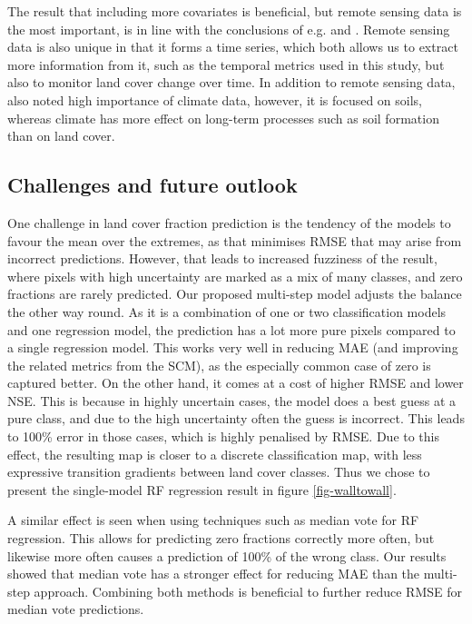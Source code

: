 \documentclass[review,authoryear,3p]{elsarticle}
\begin{document}
The result that including more covariates is beneficial, but remote sensing data is the most important, is in line with the conclusions of e.g. \citet{li_monitoring_2018} and \citet{hengl_soilgrids250m_2017}.
Remote sensing data is also unique in that it forms a time series, which both allows us to extract more information from it, such as the temporal metrics used in this study, but also to monitor land cover change over time.
In addition to remote sensing data, \citet{hengl_soilgrids250m_2017} also noted high importance of climate data, however, it is focused on soils, whereas climate has more effect on long-term processes such as soil formation than on land cover.

\subsection{Challenges and future outlook}

One challenge in land cover fraction prediction is the tendency of the models to favour the mean over the extremes, as that minimises \gls{RMSE} that may arise from incorrect predictions.
However, that leads to increased fuzziness of the result, where pixels with high uncertainty are marked as a mix of many classes, and zero fractions are rarely predicted.
Our proposed multi-step model adjusts the balance the other way round.
As it is a combination of one or two classification models and one regression model, the prediction has a lot more pure pixels compared to a single regression model.
This works very well in reducing \gls{MAE} (and improving the related metrics from the \gls{SCM}), as the especially common case of zero is captured better.
On the other hand, it comes at a cost of higher \gls{RMSE} and lower \gls{NSE}.
This is because in highly uncertain cases, the model does a best guess at a pure class, and due to the high uncertainty often the guess is incorrect.
This leads to 100\% error in those cases, which is highly penalised by \gls{RMSE}.
Due to this effect, the resulting map is closer to a discrete classification map, with less expressive transition gradients between land cover classes.
Thus we chose to present the single-model \gls{RF} regression result in figure \ref{fig-walltowall}.

A similar effect is seen when using techniques such as median vote for \gls{RF} regression.
This allows for predicting zero fractions correctly more often, but likewise more often causes a prediction of 100\% of the wrong class.
Our results showed that median vote has a stronger effect for reducing \gls{MAE} than the multi-step approach.
Combining both methods is beneficial to further reduce \gls{RMSE} for median vote predictions.
\end{document}
